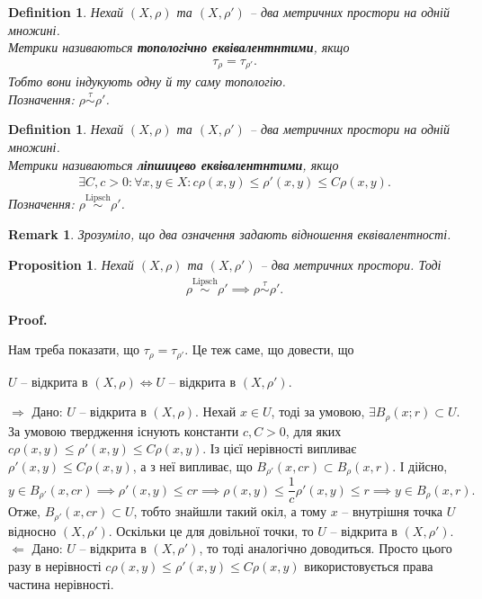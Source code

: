 \documentclass[a4paper, 10pt]{article}
\makeatletter
\def\rightproof{$\boxed{\Rightarrow}$ }
\def\leftproof{$\boxed{\Leftarrow}$ }
\theoremstyle{theoremdd}
\newtheorem{definition}[theorem]{Definition}
\newtheorem{proposition}[theorem]{Proposition}
\newtheorem{remark}[theorem]{Remark}
\renewenvironment{proof}[1][Proof.\\]{\par
\pushQED{\hfill \qed}%
\normalfont \topsep6\p@\@plus6\p@\relax
\trivlist
\item\relax
{\bfseries
#1\@addpunct{.}}\hspace\labelsep\ignorespaces
}{%
\popQED\endtrivlist\@endpefalse
}
\makeatother
\begin{document}
\begin{definition}
Нехай $(X,\rho)$ та $(X,\rho')$ -- два метричних простори на одній множині.\\
Метрики називаються \textbf{топологічно еквівалентнтими}, якщо
\begin{align*}
\tau_\rho = \tau_{\rho'}.
\end{align*}
Тобто вони індукують одну й ту саму топологію.\\
Позначення: $\rho \overset{\tau}{\sim} \rho'$.
\end{definition}

\begin{definition}
Нехай $(X,\rho)$ та $(X,\rho')$ -- два метричних простори на одній множині.\\
Метрики називаються \textbf{ліпшицево еквівалентнтими}, якщо
\begin{align*}
\exists C, c > 0: \forall x,y \in X: c \rho(x,y) \leq \rho'(x,y) \leq C \rho(x,y).
\end{align*}
Позначення: $\rho \overset{\text{Lipsch}}{\sim} \rho'$.
\end{definition}

\begin{remark}
Зрозуміло, що два означення задають відношення еквівалентності.
\end{remark}

\begin{proposition}
Нехай $(X,\rho)$ та $(X,\rho')$ -- два метричних простори. Тоді
\begin{align*}
\rho \overset{\text{Lipsch}}{\sim} \rho' \implies \rho \overset{\tau}{\sim} \rho'.
\end{align*}
\end{proposition}

\begin{proof}
Нам треба показати, що $\tau_\rho = \tau_{\rho'}$. Це теж саме, що довести, що
\begin{center}
$U$ -- відкрита в $(X,\rho) \iff U$ -- відкрита в $(X,\rho')$.
\end{center}
\rightproof Дано: $U$ -- відкрита в $(X,\rho)$. Нехай $x \in U$, тоді за умовою, $\exists B_\rho(x;r) \subset U$. За умовою твердження існують константи $c,C >0$, для яких $c \rho(x,y) \leq \rho'(x,y) \leq C \rho (x,y)$. Із цієї нерівності випливає $\rho'(x,y) \leq C \rho(x,y)$, а з неї випливає, що $B_{\rho'}(x, c r) \subset B_{\rho}(x,r)$. І дійсно,
\[
y \in B_{\rho'}(x,cr) \implies \rho'(x,y) \leq cr \implies \rho(x,y) \leq \dfrac{1}{c} \rho'(x,y) \leq r \implies y \in B_{\rho}(x,r).
\]
Отже, $B_{\rho'}(x,cr) \subset U$, тобто знайшли такий окіл, а тому $x$ -- внутрішня точка $U$ відносно $(X,\rho')$. Оскільки це для довільної точки, то $U$ -- відкрита в $(X,\rho')$.
\bigskip \\
\leftproof Дано: $U$ -- відкрита в $(X,\rho')$, то тоді аналогічно доводиться. Просто цього разу в нерівності $c \rho(x,y) \leq \rho'(x,y) \leq C \rho(x,y)$ використовується права частина нерівності.
\end{proof}
\end{document}
